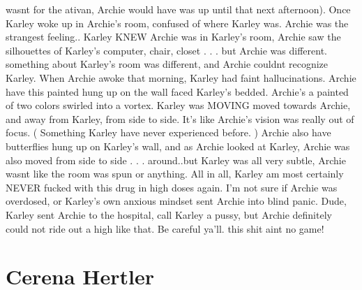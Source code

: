 \documentclass[12pt]{book}
\begin{document}
wasnt for the ativan, Archie would have was up until that next afternoon). Once Karley woke up in Archie's room, confused of where Karley was. Archie was the strangest feeling.. Karley KNEW Archie was in Karley's room, Archie saw the silhouettes of Karley's computer, chair, closet . . .  but Archie was different. something about Karley's room was different, and Archie couldnt recognize Karley. When Archie awoke that morning, Karley had faint hallucinations. Archie have this painted hung up on the wall faced Karley's bedded. Archie's a painted of two colors swirled into a vortex. Karley was MOVING moved towards Archie, and away from Karley, from side to side. It's like Archie's vision was really out of focus. ( Something Karley have never experienced before. ) Archie also have butterflies hung up on Karley's wall, and as Archie looked at Karley, Archie was also moved from side to side . . .  around..but Karley was all very subtle, Archie wasnt like the room was spun or anything. All in all, Karley am most certainly NEVER fucked with this drug in high doses again. I'm not sure if Archie was overdosed, or Karley's own anxious mindset sent Archie into blind panic. Dude, Karley sent Archie to the hospital, call Karley a pussy, but Archie definitely could not ride out a high like that. Be careful ya'll. this shit aint no game!






\chapter{Cerena Hertler}
\end{document}
